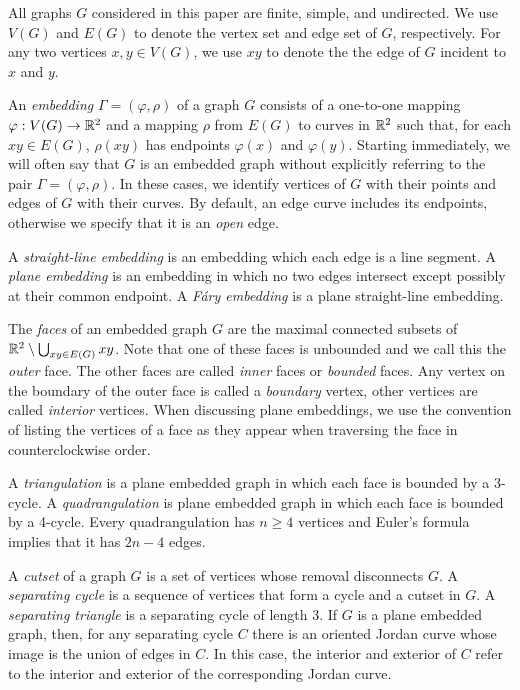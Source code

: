 \documentclass{patmorin}
\begin{document}
All graphs $G$ considered in this paper are finite, simple, and
undirected.   We use $V(G)$ and $E(G)$ to denote the vertex set and edge
set of $G$, respectively. For any two vertices $x,y\in V(G)$, we use $xy$
to denote the the edge of $G$ incident to $x$ and $y$.

An \emph{embedding} $\Gamma=(\varphi,\rho)$ of a graph $G$ consists
of a one-to-one mapping $\varphi:V(G)\to\mathbb{R}^2$ and a mapping $\rho$ from
$E(G)$ to curves in $\mathbb{R}^2$ such that, for each $xy\in E(G)$, $\rho(xy)$
has endpoints $\varphi(x)$ and $\varphi(y)$.
Starting immediately,  we will often say that $G$ is an embedded graph
without explicitly referring to the pair $\Gamma=(\varphi,\rho)$.
In these cases, we identify vertices of $G$ with their
points and edges of $G$ with their curves. By default, an edge curve includes
its endpoints, otherwise we specify that it is an \emph{open} edge.

A \emph{straight-line embedding} is
an embedding which each edge is a line segment.  A \emph{plane embedding}
is an embedding in which no two edges intersect except possibly at their
common endpoint.  A \emph{Fáry embedding} is a plane straight-line
embedding.

The \emph{faces} of an embedded graph $G$ are the maximal connected
subsets of $\mathbb{R}^2\setminus\bigcup_{xy\in E(G)} xy$.  Note that one of
these faces is unbounded and we call this the \emph{outer} face. The
other faces are called \emph{inner} faces or \emph{bounded} faces.
Any vertex on the boundary of the outer face is called a \emph{boundary} vertex, other vertices are called \emph{interior} vertices.
When discussing plane embeddings, we use the convention of listing
the vertices of a face as they appear when traversing the face in
counterclockwise order.

A \emph{triangulation} is a plane embedded graph in which each face is
bounded by a 3-cycle.  A \emph{quadrangulation} is plane embedded graph
in which each face is bounded by a 4-cycle. Every quadrangulation has
$n\ge 4$ vertices and Euler's formula implies that it has $2n-4$ edges.

A \emph{cutset} of a graph $G$ is a set of vertices whose removal
disconnects $G$.  A \emph{separating cycle} is a sequence of vertices
that form a cycle and a cutset in $G$.  A \emph{separating triangle} is
a separating cycle of length 3.  If $G$ is a plane embedded graph, then,
for any separating cycle $C$ there is an oriented Jordan curve whose image
is the union of edges in $C$.  In this case, the interior and exterior of
$C$ refer to the interior and exterior of the corresponding Jordan curve.
\end{document}
